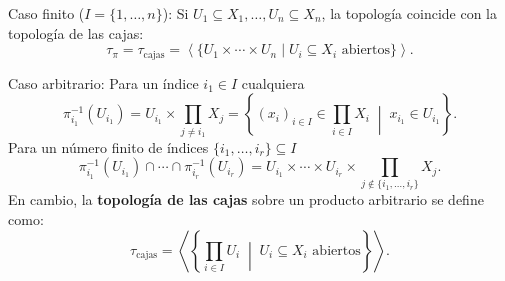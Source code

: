 Caso finito ($I = \{1, \ldots, n\}$):
Si $U_1 \subseteq X_1, \ldots, U_n \subseteq X_n$, la topología coincide con la topología de las cajas:
\[
    \tau_\pi = \tau_{\text{cajas}} = \left\langle \{U_1 \times \cdots \times U_n \mid U_i \subseteq X_i \text{ abiertos}\} \right\rangle.
\]

Caso arbitrario: Para un índice $i_1 \in I$ cualquiera
\[
    \pi_{i_1}^{-1}(U_{i_1}) = U_{i_1} \times \prod_{j \neq i_1} X_j = \left\{ (x_i)_{i \in I} \in \prod_{i \in I} X_i \;\middle|\; x_{i_1} \in U_{i_1} \right\}.
\]
Para un número finito de índices $\{i_1, \ldots, i_r\} \subseteq I$
\[
    \pi_{i_1}^{-1}(U_{i_1}) \cap \cdots \cap \pi_{i_r}^{-1}(U_{i_r}) = U_{i_1} \times \cdots \times U_{i_r} \times \prod_{j \notin \{i_1, \ldots, i_r\}} X_j.
\]
En cambio, la \textbf{topología de las cajas} sobre un producto arbitrario se define como:
\[
    \tau_{\text{cajas}} = \left\langle \left\{ \prod_{i \in I} U_i \;\middle|\; U_i \subseteq X_i \text{ abiertos} \right\} \right\rangle.
\]

